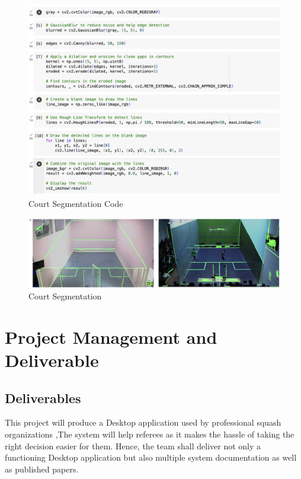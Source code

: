 \documentclass[12pt]{article}
\begin{document}
    \begin{figure}[H]
        \centering
        \includegraphics[width=1\linewidth]{figures/Segmentation code.png}
        \caption{Court Segmentation Code}
        \label{fig:Court Segmentation Code}
    \end{figure}

    \begin{figure}[H]
        \centering
        \includegraphics[width=1\linewidth]{figures/Court segmentation Images.jpg}
        \caption{Court Segmentation}
        \label{fig:Court Segmentation image}
    \end{figure}
    

\section{Project Management and Deliverable}
\subsection{Deliverables}
This project will produce a Desktop application used by professional squash organizations ,The system will help referees as it makes the hassle of taking the right decision easier for them. Hence, the team shall deliver not only a functioning Desktop application but also multiple system documentation as well as published papers.
\end{document}
